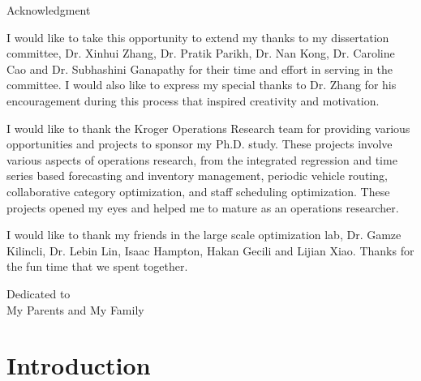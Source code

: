 \documentclass[12pt,english]{report}
\begin{document}
\begin{doublespace}
    \tableofcontents
    \listoffigures
    \listoftables
\end{doublespace}
%
\newpage
\thispagestyle{plain}
\setlength{\parindent}{0em}
\begin{center}
    {\huge Acknowledgment}
\end{center}

\setlength{\parindent}{2em}

I would like to take this opportunity to extend my thanks to my dissertation committee,  Dr. Xinhui Zhang, Dr. Pratik Parikh, Dr. Nan Kong, Dr. Caroline Cao and Dr. Subhashini Ganapathy for their time and effort in serving in the committee.  I would also like to express my special thanks to Dr. Zhang for his encouragement during this process that inspired creativity and motivation.

I would like to thank the Kroger Operations Research team for providing various opportunities and projects to sponsor my Ph.D. study.  These projects involve various aspects of operations research, from the integrated regression and time series based forecasting and inventory management, periodic vehicle routing, collaborative category optimization, and staff scheduling optimization.  These projects opened my eyes and helped me to mature as an operations researcher.

I would like to thank my friends in the large scale optimization lab,  Dr. Gamze Kilincli, Dr. Lebin Lin, Isaac Hampton, Hakan Gecili and Lijian Xiao. Thanks for the fun time that we spent together.

%
\newpage
\thispagestyle{plain}
\vspace*{3in}
\begin{center}
    Dedicated to\\
    My Parents and My Family
\end{center}


\newpage
\setcounter{page}{1}
\setlength{\parindent}{2em}
\chapter{Introduction}
\end{document}
